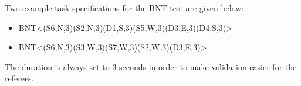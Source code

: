 Two example task specifications for the BNT test are given below:

\begin{itemize}
	\item BNT\textless(S6,N,3)(S2,N,3)(D1,S,3)(S5,W,3)(D3,E,3)(D4,S,3)\textgreater
	\item BNT\textless(S6,N,3)(S3,W,3)(S7,W,3)(S2,W,3)(D3,E,3)\textgreater
\end{itemize}

The duration is always set to 3 seconds in order to make validation easier for the referees.
%
%
%
%
%
%
%
%
%
